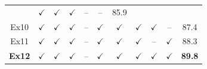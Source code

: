 \begin{minipage}[t]{0.4615\textwidth}
{{\begin{tabular}{c|cccc|ccc|cc|c}
        & $\checkmark$ & $\checkmark$ & $\checkmark$
        & -- & -- & \cellcolor{blue3}85.9 \\
        Ex10 & $\checkmark$ & $\checkmark$ & $\checkmark$ & --
        & $\checkmark$ & $\checkmark$ & $\checkmark$
        & $\checkmark$ & -- & \cellcolor{blue4}87.4 \\
        Ex11 & $\checkmark$ & $\checkmark$ & $\checkmark$ & --
        & $\checkmark$ & $\checkmark$ & $\checkmark$
        & -- & $\checkmark$ & \cellcolor{blue4}88.3 \\
        \rowcolor{tablehead}
        \textbf{Ex12} & $\checkmark$ & $\checkmark$ & $\checkmark$ & --
        & $\checkmark$ & $\checkmark$ & $\checkmark$
        & $\checkmark$ & $\checkmark$ & \cellcolor{blue4}\textbf{89.8} \\
        \bottomrule
    \end{tabular}%
    }}
\end{minipage}
